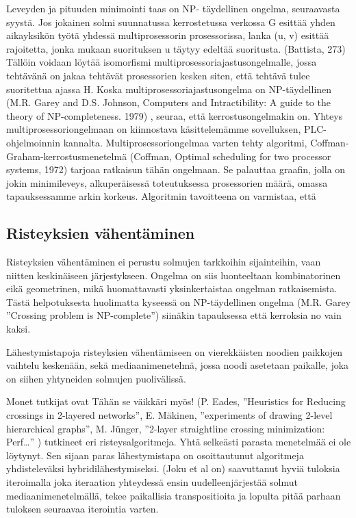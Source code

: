 \documentclass[finnish,12pt]{article}
\begin{document}
Leveyden ja pituuden minimointi taas on NP- täydellinen ongelma, seuraavasta syystä.
Jos jokainen solmi suunnatussa kerrostetussa verkossa G esittää yhden aikayksikön työtä yhdessä multiprosessorin prosessorissa, lanka (u, v) esittää rajoitetta, jonka mukaan suorituksen u täytyy edeltää suoritusta. (Battista, 273)
Tällöin voidaan löytää isomorfismi multiprosessoriajastusongelmalle, jossa tehtävänä on jakaa tehtävät prosessorien kesken siten, että tehtävä tulee suoritettua ajassa H.
Koska multiprosessoriajastusongelma on NP-täydellinen (M.R. Garey and D.S. Johnson, Computers and Intractibility: A guide to the theory of NP-completeness. 1979) , seuraa, että kerrostusongelmakin on.
Yhteys multiprosessoriongelmaan on kiinnostava käsittelemämme sovelluksen, PLC-ohjelmoinnin kannalta.
Multiprosessoriongelmaa varten tehty algoritmi, Coffman-Graham-kerrostusmenetelmä (Coffman, Optimal scheduling for two processor systems, 1972) tarjoaa ratkaisun tähän ongelmaan.
Se palauttaa graafin, jolla on jokin minimileveys, alkuperäisessä toteutuksessa prosessorien määrä, omassa tapauksessamme arkin korkeus. 
Algoritmin tavoitteena on varmistaa, että 

		\subsection{Risteyksien vähentäminen}

Risteyksien vähentäminen ei perustu solmujen tarkkoihin sijainteihin, vaan niitten keskinäiseen järjestykseen.
Ongelma on siis luonteeltaan kombinatorinen eikä geometrinen, mikä huomattavasti yksinkertaistaa ongelman ratkaisemista. 
Tästä helpotuksesta huolimatta kyseessä on NP-täydellinen ongelma (M.R. Garey ”Crossing problem is NP-complete”) siinäkin tapauksessa että kerroksia no vain kaksi.

Lähestymistapoja risteyksien vähentämiseen on vierekkäisten noodien paikkojen vaihtelu keskenään, sekä mediaanimenetelmä, jossa noodi asetetaan paikalle, joka on siihen yhtyneiden solmujen puolivälissä.

Monet tutkijat ovat Tähän se väikkäri myös! (P. Eades, ”Heuristics for Reducing crossings in 2-layered networks”, E. Mäkinen, ”experiments of drawing 2-level hierarchical graphs”, M. Jünger, ”2-layer straightline crossing minimization: Perf…” ) tutkineet eri risteysalgoritmeja. Yhtä selkeästi parasta menetelmää ei ole löytynyt. Sen sijaan paras lähestymistapa on osoittautunut algoritmeja yhdisteleväksi hybridilähestymiseksi.
(Joku et al on) saavuttanut hyviä tuloksia iteroimalla joka iteraation yhteydessä ensin uudelleenjärjestää solmut mediaanimenetelmällä, tekee paikallisia transpositioita ja lopulta pitää parhaan tuloksen seuraavaa iterointia varten.
\end{document}
